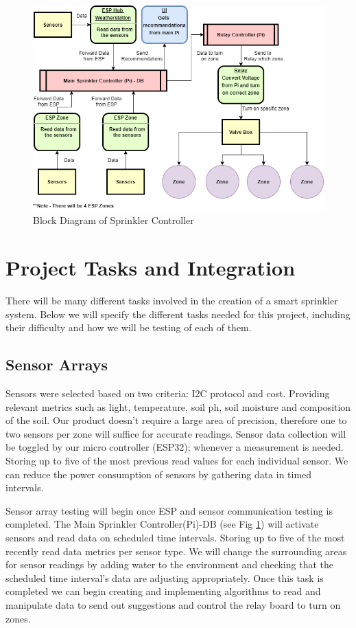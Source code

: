 \documentclass[letterpaper, 10 pt, conference]{ieeeconf}  %
\begin{document}
\begin{figure}
	\centering
	\includegraphics[width=\textwidth]{Diagram.png}
	\caption{Block Diagram of Sprinkler Controller}
	\label{label1}
\end{figure}


\section{Project Tasks and Integration}
There will be many different tasks involved in the creation of a smart sprinkler system. Below we will specify the different tasks needed for this project, including their difficulty and how we will be testing of each of them.

\subsection{Sensor Arrays}
Sensors were selected based on two criteria: I2C protocol and cost. Providing relevant metrics such as light, temperature, soil ph, soil moisture and composition of the soil. Our product doesn't require a large area of precision, therefore one to two sensors per zone will suffice for accurate readings. Sensor data collection will be toggled by our micro controller (ESP32); whenever a measurement is needed. Storing up to five of the most previous read values for each individual sensor. We can reduce the power consumption of sensors by gathering data in timed intervals.

Sensor array testing will begin once ESP and sensor communication testing is completed. The Main Sprinkler Controller(Pi)-DB (see Fig \ref{label1}) will activate sensors and read data on scheduled time intervals. Storing up to five of the most recently read data metrics per sensor type. We will change the surrounding areas for sensor readings by adding water to the environment and checking that the scheduled time interval's data are adjusting appropriately. Once this task is completed we can begin creating and implementing algorithms to read and manipulate data to send out suggestions and control the relay board to turn on zones.
\end{document}
